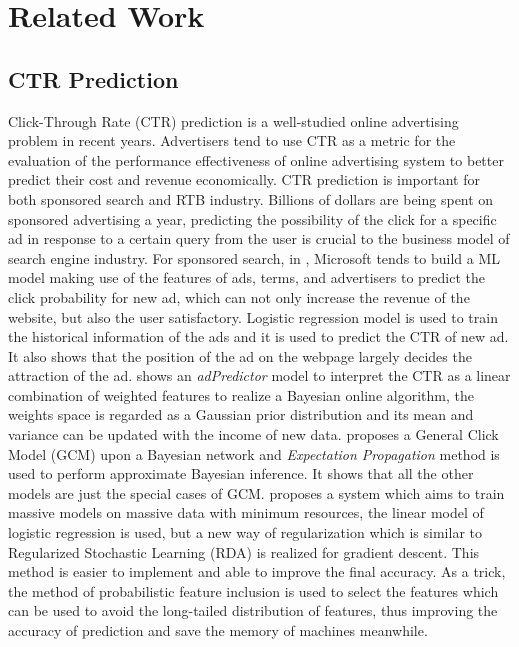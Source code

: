 \chapter{Related Work}
\label{chapterlabel2}

\section{CTR Prediction}
Click-Through Rate (CTR) prediction is a well-studied online advertising problem in recent years. Advertisers tend to use CTR as a metric for the evaluation of the performance effectiveness of online advertising system to better predict their cost and revenue economically. CTR prediction is important for both sponsored search and RTB industry. 
Billions of dollars are being spent on sponsored advertising a year, predicting the possibility of the click for a specific ad in response to a certain query from the user is crucial to the business model of search engine industry. For sponsored search, in \cite{richardson2007predicting}, Microsoft tends to build a ML model making use of the features of ads, terms, and advertisers to predict the click probability for new ad, which can not only increase the revenue of the website, but also the user satisfactory. Logistic regression model is used to train the historical information of the ads and it is used to predict the CTR of new ad. It also shows that the position of the ad on the webpage largely decides the attraction of the ad. \cite{graepel2010web} shows an \textit{adPredictor} model to interpret the CTR as a linear combination of weighted features to realize a Bayesian online algorithm, the weights space is regarded as a Gaussian prior distribution and its mean and variance can be updated with the income of new data. \cite{zhu2010novel} proposes a General Click Model (GCM) upon a Bayesian network and \textit{Expectation Propagation} method is used to perform approximate Bayesian inference. It shows that all the other models are just the special cases of GCM. \cite{mcmahan2013ad} proposes a system which aims to train massive models on massive data with minimum resources, the linear model of logistic regression is used, but a new way of regularization which is similar to Regularized Stochastic Learning (RDA) is realized for gradient descent. This method is easier to implement and able to improve the final accuracy. As a trick, the method of probabilistic feature inclusion is used to select the features which can be used to avoid the long-tailed distribution of features, thus improving the accuracy of prediction and save the memory of machines meanwhile.

